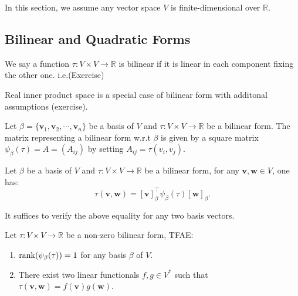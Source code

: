 In this section, we assume any vector space $V$ is finite-dimensional over $\mathbb{R}.$

\subsection{Bilinear and Quadratic Forms}

\begin{definition}
We say a function $\tau: V\times V\to\mathbb{R}$ is bilinear if it is linear in each component fixing the other one.
i.e.(Exercise)
\end{definition}

\begin{remark}
    Real inner product space is a special case of bilinear form with additonal assumptions (exercise). 
\end{remark}

\begin{definition}
    Let $\beta=\{\mathbf{v}_1,\mathbf{v}_2,\cdots,\mathbf{v}_n\}$ be a basis of $V$ and $\tau:V\times V\to\mathbb{R}$ be a bilinear form. The matrix representing a bilinear form w.r.t $\beta$ is given by a square matrix $\psi_\beta(\tau)=A=(A_{ij})$ by setting $A_{ij}=\tau(v_i,v_j)$.
\end{definition}

\begin{theorem}
     Let $\beta$ be a basis of $V$ and $\tau:V\times V\to\mathbb{R}$ be a bilinear form, for any $\mathbf{v},\mathbf{w}\in V$, one has:
     \[\tau(\mathbf{v},\mathbf{w})=[\mathbf{v}]_\beta^\top\psi_\beta(\tau)[\mathbf{w}]_\beta.\]
     \label{bilinear matrix vector product}
\end{theorem}

\begin{pfbox}
    It suffices to verify the above equality for any two basis vectors.
\end{pfbox}

\begin{proposition}
    Let $\tau:V\times V\to\mathbb{R}$ be a non-zero bilinear form, TFAE:
    \begin{enumerate}
        \item $\operatorname{rank}(\psi_\beta(\tau))=1$ for any basis $\beta$ of $V$.
        \item There exist two linear functionals $f,g\in V^*$ such that $\tau(\mathbf{v},\mathbf{w})=f(\mathbf{v})g(\mathbf{w}).$
    \end{enumerate}
    \label{linear map product and bilinear}
\end{proposition}

